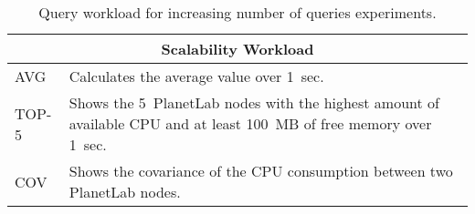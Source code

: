 \begin{table}[h!]
  \centering
  \renewcommand{\arraystretch}{1.5}
  \begin{tabular}{|m{3cm}|p{12cm}|}
    \hline
    \multicolumn{2}{|c|}{\bf Scalability Workload} \\ 
    \hline\hline
    \textnormal{AVG}	&  Calculates the average value over 1~sec. \\ 
    \hline	  
    \textnormal{TOP-5}	&  Shows the 5~PlanetLab nodes with the
    highest amount of available CPU and at least 100~MB of free memory over 1~sec.\\
    \hline	  
    \textnormal{COV} &  Shows the covariance of the CPU consumption between two PlanetLab nodes. \\
    \hline	  
  \end{tabular}
  \caption{Query workload for increasing number of queries experiments.}
  \label{table:inc-queries}
\end{table}
